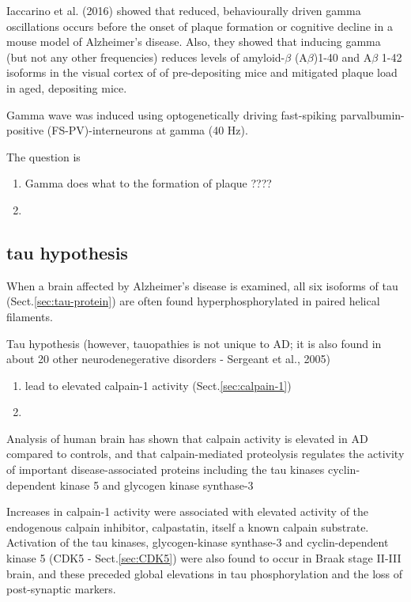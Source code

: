 Iaccarino et al. (2016) showed that reduced, behaviourally driven gamma
oscillations occurs before the onset of plaque formation or cognitive decline
in a mouse model of Alzheimer's disease. Also, they showed that inducing gamma
(but not any other frequencies)  reduces levels of amyloid-$\beta$
(A$\beta$)1-40 and A$\beta$ 1-42 isoforms in the visual cortex of of
pre-depositing mice and mitigated plaque load in aged, depositing mice.

\begin{mdframed}

Gamma wave was induced using optogenetically driving fast-spiking
parvalbumin-positive (FS-PV)-interneurons at gamma (40 Hz).

\end{mdframed}


The question is
\begin{enumerate}
  \item  Gamma does what to the formation of plaque ????
  
  \item 
\end{enumerate}




\subsection{tau hypothesis}
\label{sec:tau-Alzheimer}

When a brain affected by Alzheimer's disease is examined, all six isoforms of
tau (Sect.\ref{sec:tau-protein}) are often found hyperphosphorylated in paired
helical filaments.

Tau hypothesis (however, tauopathies is not unique to AD; it is also found in
about 20 other neurodenegerative disorders - Sergeant et al., 2005)
\begin{enumerate}
  \item lead to elevated calpain-1 activity (Sect.\ref{sec:calpain-1})
  
  \item 
\end{enumerate}

Analysis of human brain has shown that calpain activity is elevated in AD
compared to controls, and that calpain-mediated proteolysis regulates the
activity of important disease-associated proteins including the tau kinases
cyclin-dependent kinase 5 and glycogen kinase synthase-3

Increases in calpain-1 activity were associated with elevated activity of the
endogenous calpain inhibitor, calpastatin, itself a known calpain substrate.
Activation of the tau kinases, glycogen-kinase synthase-3 and cyclin-dependent
kinase 5 (CDK5 - Sect.\ref{sec:CDK5}) were also found to occur in Braak stage
II-III brain, and these preceded global elevations in tau phosphorylation and
the loss of post-synaptic markers.



